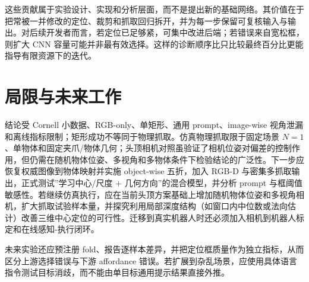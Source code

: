 \documentclass{l4proj}
\begin{document}
这些贡献属于实验设计、实现和分析层面，而不是提出新的基础网络。其价值在于把常被一并修改的定位、裁剪和抓取回归拆开，并为每一步保留可复核输入与输出。对后续开发者而言，若定位已足够紧，可集中改进后端；若错误来自宽松框，则扩大 CNN 容量可能并非最有效选择。这样的诊断顺序比只比较最终百分比更能指导有限资源下的迭代。

\section{局限与未来工作}
结论受 Cornell 小数据、RGB-only、单矩形、通用 prompt、image-wise 视角泄漏和离线指标限制；矩形成功不等同于物理抓取。仿真物理抓取限于固定场景 $N=1$、单物体和固定夹爪/物体几何；头顶相机对照虽验证了相机位姿对偏差的控制作用，但仍需在随机物体位姿、多视角和多物体条件下检验结论的广泛性。下一步应恢复权威图像到物体映射并实施 object-wise 五折，加入 RGB-D 与密集多抓取输出，正式测试”学习中心/尺度 + 几何方向”的混合模型，并分析 prompt 与框阈值敏感性。若继续仿真执行，应在当前头顶方案基础上增加随机物体位姿和多视角相机，扩大抓取试验样本量，并探究利用局部深度结构（如窗口内中位数或法向估计）改善三维中心定位的可行性。迁移到真实机器人时还必须加入相机到机器人标定和在线感知-执行闭环。

未来实验还应预注册 fold、报告逐样本差异，并把定位框质量作为独立指标，从而区分上游选择错误与下游 affordance 错误。若扩展到杂乱场景，应使用具体语言指令测试目标消歧，而不能由单目标通用提示结果直接外推。
\end{document}
